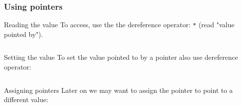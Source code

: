 \documentclass{beamer}
\begin{document}
\begin{frame}[fragile]
  \frametitle{Using pointers}
  
  \begin{block}{Reading the value}
  	To access, use the the dereference operator: \texttt{*} (read "value pointed by").
  	\begin{columns}[t]
  	  \begin{column}[T]{0.5\textwidth}
 
  	  \end{column}\pause
  	  \begin{column}[T]{0.5\textwidth}
  	  \end{column}
  	\end{columns}
  \end{block}
  \pause
  \begin{block}{Setting the value}
    To set the value pointed to by a pointer also use dereference operator:
  	\begin{columns}[t]
  	  \begin{column}[T]{0.5\textwidth}
  	  \end{column}\pause
  	  \begin{column}[T]{0.5\textwidth}
  	  \end{column}
  	\end{columns}
  \end{block}
  \pause
  \begin{block}{Assigning pointers}
  Later on we may want to assign the pointer to point to a different value:
  	\begin{columns}[t]
  	  \begin{column}[T]{0.5\textwidth}

  		\end{column}\pause
  	  \begin{column}[T]{0.5\textwidth}
  	  \end{column}
  	\end{columns}
  \end{block}
\end{frame}
\end{document}
